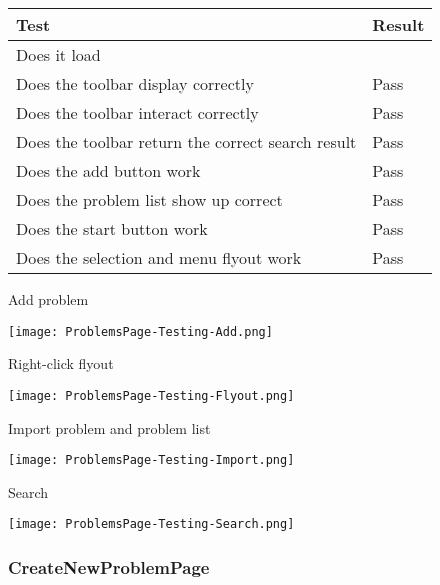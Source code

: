 \documentclass[report.tex]{subfiles}
\begin{document}
\begin{tabulary}{\linewidth}{|L|l|}
    \hline
    Test & Result \\
    \hline
    Does it load & \\
    \hline
    Does the toolbar display correctly & Pass \\
    \hline
    Does the toolbar interact correctly & Pass \\
    \hline
    Does the toolbar return the correct search result & Pass \\
    \hline
    Does the add button work & Pass \\
    \hline
    Does the problem list show up correct & Pass \\
    \hline
    Does the start button work & Pass \\
    \hline
    Does the selection and menu flyout work & Pass \\
    \hline
\end{tabulary}

Add problem

\texttt{[image: ProblemsPage-Testing-Add.png]}

Right-click flyout

\texttt{[image: ProblemsPage-Testing-Flyout.png]}

Import problem and problem list

\texttt{[image: ProblemsPage-Testing-Import.png]}

Search

\texttt{[image: ProblemsPage-Testing-Search.png]}

\subsubsection{CreateNewProblemPage}
\end{document}
